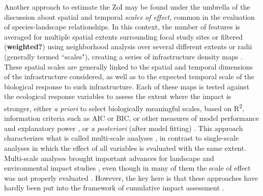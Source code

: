 \documentclass[titlepage]{article}
\begin{document}
Another approach to estimate the ZoI may be found under the umbrella of the discussion about spatial and temporal \textit{scales of effect}, common in the evaluation of species-landscape relationships. In this context, the number of features is averaged for multiple spatial extents surrounding focal study sites \citep{jackson_are_2015} or filtered (\textbf{weighted?}) using neighborhood analysis over several different extents or radii (generally termed ``scales"), creating a series of infrastructure density maps \citep{mcgarigal_multi-scale_2016}. These spatial scales are generally linked to the spatial and temporal dimensions of the infrastructure considered, as well as to the expected temporal scale of the biological response to such infrastructure. Each of these maps is tested against the ecological response variables to assess the extent where the impact is stronger, either \textit{a priori} to select biologically meaningful scales, based on R\textsuperscript{2}, information criteria such as AIC or BIC, or other measures of model performance and explanatory power \citep{jackson_are_2015, huais_multifit_2018}, or \textit{a posteriori} (after model fitting) \citep{thompson_influence_2002}. This approach characterizes what is called multi-scale analyses \citep[e.g.][]{zeller_multi-level_2017}, in contrast to single-scale analyses in which the effect of all variables is evaluated with the same extent. Multi-scale analyses brought important advances for landscape and environmental impact studies \citep[e.g.][]{mcgarigal_multi-scale_2016}, even though in many of them the scale of effect was not properly evaluated \citep{jackson_are_2015}. However, the key here is that these approaches have hardly been put into the framework of cumulative impact assessment \citep[but see, for instance,][]{polfus_identifying_2011}. 
\end{document}
